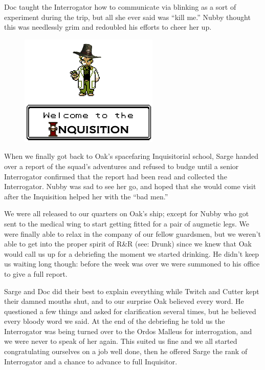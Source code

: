 Doc taught the Interrogator how to communicate via blinking as a sort of experiment during the trip, but all she ever said was “kill me.” 
Nubby thought this was needlessly grim and redoubled his efforts to cheer her up.

\begin{figure}
	\begin{center}
		\includegraphics[width=\figwidth]{pics/5/42.png}
	\end{center}
\end{figure}
When we finally got back to Oak’s spacefaring Inquisitorial school, Sarge handed over a report of the squad’s adventures and refused to budge until a senior Interrogator confirmed that the report had been read and collected the Interrogator. 
Nubby was sad to see her go, and hoped that she would come visit after the Inquisition helped her with the “bad men.”

We were all released to our quarters on Oak’s ship; except for Nubby who got sent to the medical wing to start getting fitted for a pair of augmetic legs. 
We were finally able to relax in the company of our fellow guardsmen, but we weren’t able to get into the proper spirit of R\&R (see: Drunk) since we knew that Oak would call us up for a debriefing the moment we started drinking. 
He didn’t keep us waiting long though: before the week was over we were summoned to his office to give a full report.

Sarge and Doc did their best to explain everything while Twitch and Cutter kept their damned mouths shut, and to our surprise Oak believed every word. 
He questioned a few things and asked for clarification several times, but he believed every bloody word we said. 
At the end of the debriefing he told us the Interrogator was being turned over to the Ordos Malleus for interrogation, and we were never to speak of her again. 
This suited us fine and we all started congratulating ourselves on a job well done, then he offered Sarge the rank of Interrogator and a chance to advance to full Inquisitor.

